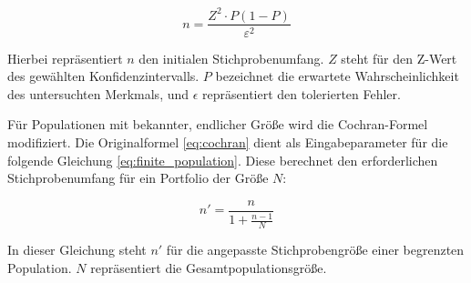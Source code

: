 \begin{equation}
n = \frac{Z^2 \cdot P(1 - P)}{\varepsilon^2}
\label{eq:cochran}
\end{equation}

Hierbei repräsentiert $n$ den initialen Stichprobenumfang. $Z$ steht für den Z-Wert des gewählten Konfidenzintervalls. $P$ bezeichnet die erwartete Wahrscheinlichkeit des untersuchten Merkmals, und $\epsilon$ repräsentiert den tolerierten Fehler.

Für Populationen mit bekannter, endlicher Größe wird die Cochran-Formel modifiziert. Die Originalformel \ref{eq:cochran} dient als Eingabeparameter für die folgende Gleichung \ref{eq:finite_population}. Diese berechnet den erforderlichen Stichprobenumfang für ein Portfolio der Größe $N$:

\begin{equation}
n' = \frac{n}{1 + \frac{n - 1}{N}}
\label{eq:finite_population}
\end{equation}

In dieser Gleichung steht $n'$ für die angepasste Stichprobengröße einer begrenzten Population. $N$ repräsentiert die Gesamtpopulationsgröße.